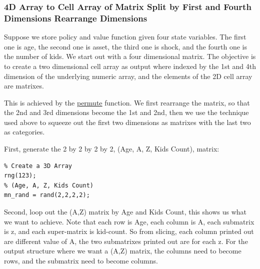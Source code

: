 \documentclass[
]{book}
\begin{document}
\hypertarget{d-array-to-cell-array-of-matrix-split-by-first-and-fourth-dimensions-rearrange-dimensions}{%
\subsubsection{4D Array to Cell Array of Matrix Split by First and Fourth Dimensions Rearrange Dimensions}\label{d-array-to-cell-array-of-matrix-split-by-first-and-fourth-dimensions-rearrange-dimensions}}

Suppose we store policy and value function given four state variables.
The first one is age, the second one is asset, the third one is shock,
and the fourth one is the number of kids. We start out with a four
dimensional matrix. The objective is to create a two dimensional cell
array as output where indexed by the 1st and 4th dimension of the
underlying numeric array, and the elements of the 2D cell array are
matrixes.

This is achieved by the
\href{https://www.mathworks.com/help/matlab/ref/permute.html}{permute}
function. We first rearrange the matrix, so that the 2nd and 3rd
dimensions become the 1st and 2nd, then we use the technique used above
to squeeze out the first two dimensions as matrixes with the last two as
categories.

First, generate the 2 by 2 by 2 by 2, (Age, A, Z, Kids Count), matrix:

\begin{verbatim}
% Create a 3D Array
rng(123);
% (Age, A, Z, Kids Count)
mn_rand = rand(2,2,2,2);
\end{verbatim}

Second, loop out the (A,Z) matrix by Age and Kids Count, this shows us
what we want to achieve. Note that each row is Age, each column is A,
each submatrix is z, and each super-matrix is kid-count. So from
slicing, each column printed out are different value of A, the two
submatrixes printed out are for each z. For the output structure where
we want a (A,Z) matrix, the columns need to become rows, and the
submatrix need to become columns.
\end{document}
